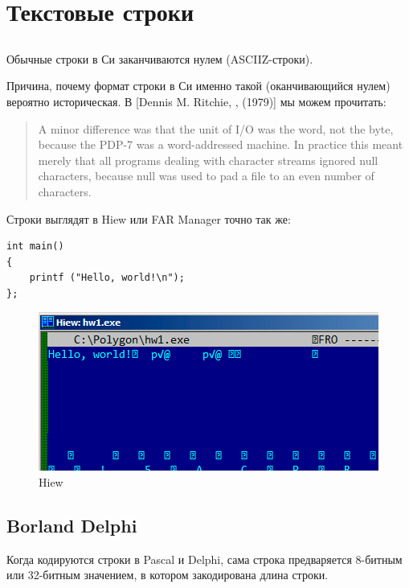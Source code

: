 \section{Текстовые строки}

\subsection{\CCpp}

\label{C_strings}
Обычные строки в Си заканчиваются нулем (\ac{ASCIIZ}-строки).

Причина, почему формат строки в Си именно такой (оканчивающийся нулем) вероятно историческая.
В [Dennis M. Ritchie, , (1979)]
мы можем прочитать:

\begin{framed}
\begin{quotation}
A minor difference was that the unit of I/O was the word, not the byte, because the PDP-7 was a word-addressed
machine. In practice this meant merely that all programs dealing with character streams ignored null
characters, because null was used to pad a file to an even number of characters.
\end{quotation}
\end{framed}

Строки выглядят в Hiew или FAR Manager точно так же:

\begin{lstlisting}
int main()
{
	printf ("Hello, world!\n");
};
\end{lstlisting}

\begin{figure}[H]
\centering
\includegraphics[scale=\NormalScale]{digging_into_code/strings/C-string.png}
\caption{Hiew}
\end{figure}


\subsection{Borland Delphi}
Когда кодируются строки в Pascal и Delphi, сама строка предваряется 8-битным или 32-битным значением, в котором закодирована длина строки.

